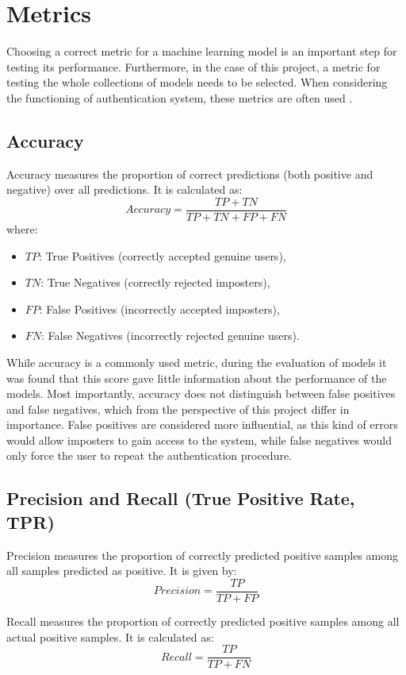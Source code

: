 \section{Metrics}
Choosing a correct metric for a machine learning model is an important step for testing its performance. Furthermore, in the case of this project, a metric for testing the whole collections of models needs to be selected.
When considering the functioning of authentication system, these metrics are often used \cite{traore2011continuous}. 

\subsection{Accuracy}
Accuracy measures the proportion of correct predictions (both positive and negative) over all predictions. It is calculated as:
\[
Accuracy = \frac{TP + TN}{TP + TN + FP + FN}
\]
where:
\begin{itemize}
	\item $TP$: True Positives (correctly accepted genuine users),
	\item $TN$: True Negatives (correctly rejected imposters),
	\item $FP$: False Positives (incorrectly accepted imposters),
	\item $FN$: False Negatives (incorrectly rejected genuine users).
\end{itemize}

While accuracy is a commonly used metric, during the evaluation of models it was found that this score gave little information about the performance of the models. Most importantly, accuracy does not distinguish between false positives and false negatives, which from the perspective of this project differ in importance. False positives are considered more influential, as this kind of errors would allow imposters to gain access to the system, while false negatives would only force the user to repeat the authentication procedure.

\subsection{Precision and Recall (True Positive Rate, TPR)}
Precision measures the proportion of correctly predicted positive samples among all samples predicted as positive. It is given by:
\[
Precision = \frac{TP}{TP + FP}
\]

Recall measures the proportion of correctly predicted positive samples among all actual positive samples. It is calculated as:
\[
Recall = \frac{TP}{TP + FN}
\]

